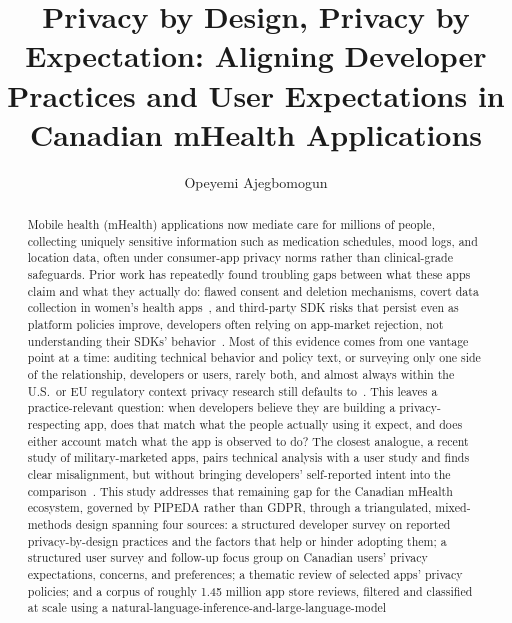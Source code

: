 \documentclass[sigconf,balance=false]{acmart}
\begin{document}
\title[Privacy by Design, Privacy by Expectation]{Privacy by Design, Privacy by Expectation: Aligning Developer Practices and User Expectations in Canadian mHealth Applications}

\author{Opeyemi Ajegbomogun}

\renewcommand{\shortauthors}{Ajegbomogun}

\begin{abstract}
Mobile health (mHealth) applications now mediate care for millions of people,
collecting uniquely sensitive information such as medication schedules, mood
logs, and location data, often under consumer-app privacy norms rather than
clinical-grade safeguards. Prior work has repeatedly found troubling gaps
between what these apps claim and what they actually do: flawed consent and
deletion mechanisms, covert data collection in women's health
apps~\cite{malki2024exploring}, and third-party SDK risks that persist even
as platform policies improve, developers often relying on app-market
rejection, not understanding their SDKs'
behavior~\cite{alomar2025effect,alomar2022developers}. Most of this evidence
comes from one vantage point at a time: auditing technical behavior and
policy text, or surveying only one side of the relationship, developers or
users, rarely both, and almost always within the U.S.\ or EU regulatory
context privacy research still defaults to~\cite{sharma2026local}. This
leaves a practice-relevant question: when
developers believe they are building a privacy-respecting app, does that
match what the people actually using it expect, and does either account
match what the app is observed to do? The closest analogue, a recent study
of military-marketed apps, pairs technical analysis with a user study and
finds clear misalignment, but without bringing developers' self-reported
intent into the comparison~\cite{shinkle2026noprivacy}. This study addresses
that remaining gap for the Canadian mHealth ecosystem, governed by PIPEDA
rather than GDPR, through a triangulated, mixed-methods design spanning four
sources: a structured developer survey on reported privacy-by-design
practices and the factors that help or hinder adopting them; a structured
user survey and follow-up focus group on Canadian users' privacy
expectations, concerns, and preferences; a thematic review of selected
apps' privacy policies; and a corpus of roughly 1.45 million app store
reviews, filtered and classified at scale using a natural-language-inference-and-large-language-model

\end{abstract}
\end{document}
